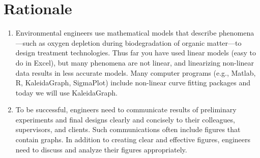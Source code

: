 \documentclass[12pt,letterpaper]{article}
\begin{document}
\section *{Rationale}
\begin{enumerate}
\item Environmental engineers use mathematical models that describe phenomena---such as oxygen depletion during biodegradation of organic matter---to design treatment technologies.  Thus far you have used linear models (easy to do in Excel), but many phenomena are not linear, and linearizing non-linear data results in less accurate models.  Many computer programs (e.g., Matlab, R, KaleidaGraph, SigmaPlot) include non-linear curve fitting packages and today we will use KaleidaGraph.  
\item To be successful, engineers need to communicate results of preliminary experiments and final designs clearly and concisely to their colleagues, supervisors, and clients.  Such communications often include figures that contain graphs.  In addition to creating clear and effective figures, engineers need to discuss and analyze their figures appropriately. 
\end{enumerate}
 
\end{document}
